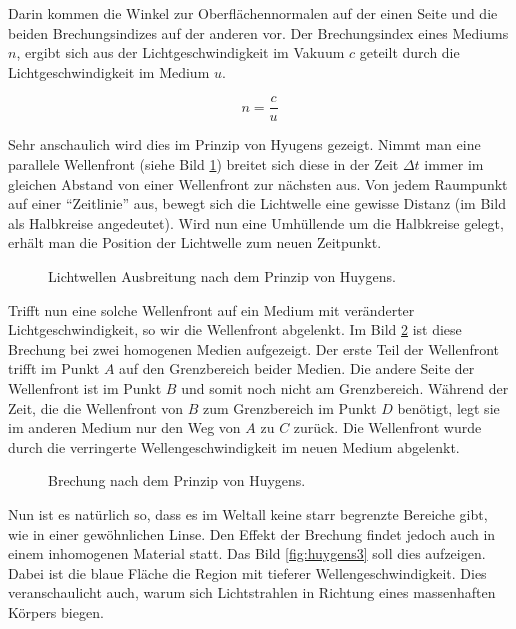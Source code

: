\begin{refsection}
Darin kommen die Winkel zur Oberflächennormalen auf der einen Seite
und die beiden Brechungsindizes auf der anderen vor.  Der
Brechungsindex eines Mediums \(n\), ergibt sich aus der
Lichtgeschwindigkeit im Vakuum \(c\) geteilt durch die
Lichtgeschwindigkeit im Medium \(u\).

\begin{equation}
  n = \frac{c}{u}
\end{equation}

Sehr anschaulich wird dies im Prinzip von Hyugens gezeigt.  Nimmt man
eine parallele Wellenfront (siehe Bild \ref{fig:huygens1}) breitet
sich diese in der Zeit \(\Delta t\) immer im gleichen Abstand von
einer Wellenfront zur nächsten aus.  Von jedem Raumpunkt auf einer
``Zeitlinie'' aus, bewegt sich die Lichtwelle eine gewisse Distanz (im
Bild als Halbkreise angedeutet).  Wird nun eine Umhüllende um die
Halbkreise gelegt, erhält man die Position der Lichtwelle zum neuen
Zeitpunkt.

\begin{figure}
  \centering
  
  \caption{Lichtwellen Ausbreitung nach dem Prinzip von Huygens.}
  \label{fig:huygens1}
\end{figure}

Trifft nun eine solche Wellenfront auf ein Medium mit veränderter
Lichtgeschwindigkeit, so wir die Wellenfront abgelenkt.  Im Bild
\ref{fig:huygens2} ist diese Brechung bei zwei homogenen Medien
aufgezeigt.  Der erste Teil der Wellenfront trifft im Punkt \(A\) auf
den Grenzbereich beider Medien.  Die andere Seite der Wellenfront ist
im Punkt \(B\) und somit noch nicht am Grenzbereich.  Während der
Zeit, die die Wellenfront von \(B\) zum Grenzbereich im Punkt \(D\)
benötigt, legt sie im anderen Medium nur den Weg von \(A\) zu \(C\)
zurück.  Die Wellenfront wurde durch die verringerte
Wellengeschwindigkeit im neuen Medium abgelenkt.

\begin{figure}
  \centering
  
  \caption{Brechung nach dem Prinzip von Huygens.}
  \label{fig:huygens2}
\end{figure}

Nun ist es natürlich so, dass es im Weltall keine starr begrenzte
Bereiche gibt, wie in einer gewöhnlichen Linse.  Den Effekt der
Brechung findet jedoch auch in einem inhomogenen Material statt.  Das
Bild \ref{fig:huygens3} soll dies aufzeigen.  Dabei ist die blaue
Fläche die Region mit tieferer Wellengeschwindigkeit.  Dies
veranschaulicht auch, warum sich Lichtstrahlen in Richtung eines
massenhaften Körpers biegen.


\end{refsection}
